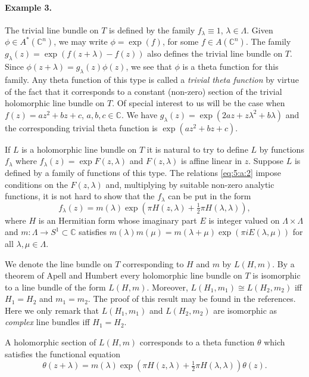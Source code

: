 \paragraph{Example 3.} The trivial line bundle on $T$ is defined by the family $f_\lambda\equiv1$, $\lambda\in\Lambda$. Given $\phi\in A^*(\mathbb C^n)$, we may write $\phi=\exp(f)$, for some $f\in A(\mathbb C^n)$. The family $g_\lambda(z)=\exp(f(z+\lambda)-f(z))$ also defines the trivial line bundle on $T$. Since $\phi(z+\lambda)=g_\lambda(z)\phi(z)$, we see that $\phi$ is a theta function for this family. Any theta function of this type is called a \emph{trivial theta function} by virtue of the fact that it corresponds to a constant (non-zero) section of the trivial holomorphic line bundle on $T$. Of special interest to us will be the case when $f(z)=az^2+bz+c$, $a,b,c\in\mathbb C$. We have $g_\lambda(z)=\exp(2az+z\lambda^2+b\lambda)$ and the corresponding trivial theta function is $\exp(az^2+bz+c)$.

If $L$ is a holomorphic line bundle on $T$ it is natural to try to define $L$ by functions $f_\lambda$ where $f_\lambda(z)=\exp F(z,\lambda)$ and $F(z,\lambda)$ is affine linear in $z$. Suppose $L$ is defined by a family of functions of this type. The relations \eqref{eq:5:a:2} impose conditions on the $F(z,\lambda)$ and, multiplying by suitable non-zero analytic functions, it is not hard to show that the $f_\lambda$ can be put in the form
\[f_\lambda(z)=m(\lambda)\exp(\pi H(z,\lambda)+\tfrac12\pi H(\lambda,\lambda)),\]
where $H$ is an Hermitian form whose imaginary part $E$ is integer valued on $\Lambda\times\Lambda$ and $m:\Lambda\to S^1\subset\mathbb C$ satisfies $m(\lambda)m(\mu)=m(\lambda+\mu)\exp(\pi iE(\lambda,\mu))$ for all $\lambda,\mu\in\Lambda$.

We denote the line bundle on $T$ corresponding to $H$ and $m$ by $L(H,m)$. By a theorem of Apell and Humbert every holomorphic line bundle on $T$ is isomorphic to a line bundle of the form $L(H,m)$. Moreover, $L(H_1,m_1)\cong L(H_2,m_2)$ iff $H_1=H_2$ and $m_1=m_2$. The proof of this result may be found in the references. Here we only remark that $L(H_1,m_1)$ and $L(H_2,m_2)$ are isomorphic as \emph{complex} line bundles iff $H_1=H_2$.

A holomorphic section of $L(H,m)$ corresponds to a theta function $\theta$ which satisfies the functional equation
\[\theta(z+\lambda)=m(\lambda)\exp(\pi H(z,\lambda)+\tfrac12\pi H(\lambda,\lambda))\theta(z).\]
